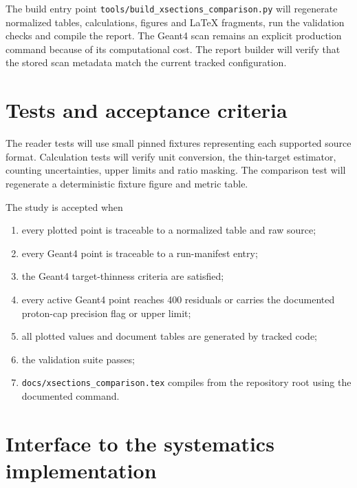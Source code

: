 \documentclass[11pt]{article}
\newcommand{\file}[1]{\texttt{#1}}
\begin{document}
The build entry point \file{tools/build\_xsections\_comparison.py} will
regenerate normalized tables, calculations, figures and LaTeX fragments, run
the validation checks and compile the report.  The Geant4 scan remains an
explicit production command because of its computational cost.  The report
builder will verify that the stored scan metadata match the current tracked
configuration.

\section{Tests and acceptance criteria}

The reader tests will use small pinned fixtures representing each supported
source format.  Calculation tests will verify unit conversion, the
thin-target estimator, counting uncertainties, upper limits and ratio masking.
The comparison test will regenerate a deterministic fixture figure and metric
table.

The study is accepted when
\begin{enumerate}[nosep]
  \item every plotted point is traceable to a normalized table and raw source;
  \item every Geant4 point is traceable to a run-manifest entry;
  \item the Geant4 target-thinness criteria are satisfied;
  \item every active Geant4 point reaches 400 residuals or carries the
        documented proton-cap precision flag or upper limit;
  \item all plotted values and document tables are generated by tracked code;
  \item the validation suite passes;
  \item \file{docs/xsections\_comparison.tex} compiles from the repository
        root using the documented command.
\end{enumerate}

\section{Interface to the systematics implementation}
\end{document}
